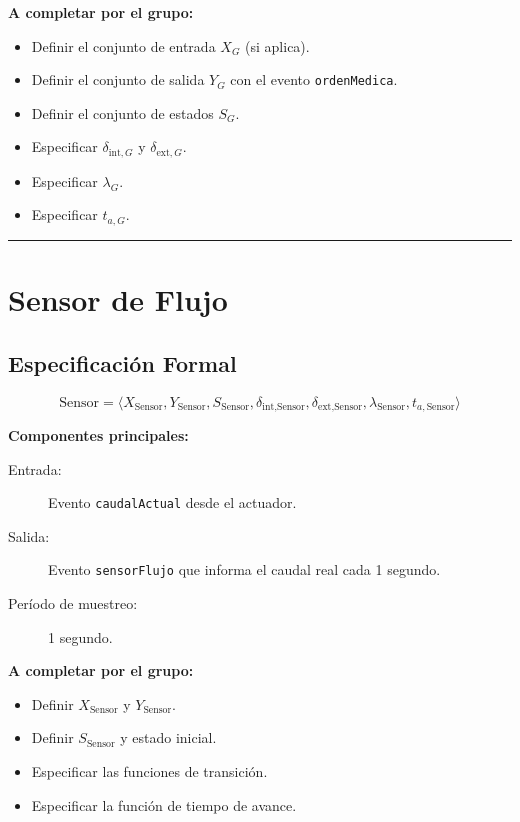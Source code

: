 \documentclass[12pt,a4paper,oneside]{report}
\begin{document}
\textbf{A completar por el grupo:}

\begin{itemize}
    \item Definir el conjunto de entrada $X_G$ (si aplica).
    \item Definir el conjunto de salida $Y_G$ con el evento \texttt{ordenMedica}.
    \item Definir el conjunto de estados $S_G$.
    \item Especificar $\delta_{\text{int},G}$ y $\delta_{\text{ext},G}$.
    \item Especificar $\lambda_G$.
    \item Especificar $t_{a,G}$.
\end{itemize}

\noindent\rule{\textwidth}{0.5pt}

\section{Sensor de Flujo}

\subsection{Especificación Formal}

\[
\text{Sensor} = \langle X_{\text{Sensor}}, Y_{\text{Sensor}}, S_{\text{Sensor}}, \delta_{\text{int},\text{Sensor}}, \delta_{\text{ext},\text{Sensor}}, \lambda_{\text{Sensor}}, t_{a,\text{Sensor}} \rangle
\]

\textbf{Componentes principales:}

\begin{description}
    \item[Entrada:] Evento \texttt{caudalActual} desde el actuador.
    \item[Salida:] Evento \texttt{sensorFlujo} que informa el caudal real cada 1 segundo.
    \item[Período de muestreo:] 1 segundo.
\end{description}

\textbf{A completar por el grupo:}

\begin{itemize}
    \item Definir $X_{\text{Sensor}}$ y $Y_{\text{Sensor}}$.
    \item Definir $S_{\text{Sensor}}$ y estado inicial.
    \item Especificar las funciones de transición.
    \item Especificar la función de tiempo de avance.
\end{itemize}
\end{document}
